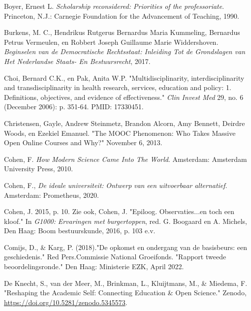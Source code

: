 \documentclass[smallauthor, chapterhaspagenum, nochapterinheader, pagenuminheader,  bigchapnum,medium2, tocpages,  garamond, titleinheader]{jote-book}
\begin{document}
\begin{references}
		Boyer, Ernest L. \emph{Scholarship reconsidered: Priorities of the professoriate}. Princeton, N.J.: Carnegie Foundation for the Advancement of Teaching, 1990.



		Burkens, M. C., Hendrikus Rutgerus Bernardus Maria Kummeling, Bernardus Petrus Vermeulen, en Robbert Joseph Guillaume Marie Widdershoven. \emph{Beginselen van de Democratische Rechtsstaat: Inleiding Tot de Grondslagen van Het Nederlandse Staats- En Bestuursrecht}, 2017.



		Choi, Bernard C.K., en Pak, Anita W.P. "Multidisciplinarity, interdisciplinarity and transdisciplinarity in health research, services, education and policy: 1. Definitions, objectives, and evidence of effectiveness." \emph{Clin Invest Med} 29, no. 6 (December 2006): p. 351-64. PMID: 17330451.



		Christensen, Gayle, Andrew Steinmetz, Brandon Alcorn, Amy Bennett, Deirdre Woods, en Ezekiel Emanuel. "The MOOC Phenomenon: Who Takes Massive Open Online Courses and Why?" November 6, 2013.



		Cohen, F.\emph{ How Modern Science Came Into The World}. Amsterdam: Amsterdam University Press, 2010.



		Cohen, F., \emph{De }\emph{ideale}\emph{ }\emph{universiteit}\emph{: }\emph{Ontwerp}\emph{ van }\emph{een}\emph{ }\emph{uitvoerbaar}\emph{ }\emph{alternatief}. Amsterdam: Prometheus, 2020.



		Cohen, J. 2015, p. 10. Zie ook, Cohen, J. "Epiloog. Observaties...en toch een kloof." In \emph{G1000: }\emph{Ervaringen}\emph{ met }\emph{burgertoppen}, red. G. Boogaard en A. Michels, Den Haag: Boom bestuurskunde, 2016, p. 103 e.v.



		Comijs, D., \& Karg, P. (2018)."De opkomst en ondergang van de basisbeurs: een geschiedenis." Red Pers.Commissie National Groeifonds. "Rapport tweede beoordelingsronde." Den Haag: Ministerie EZK, April 2022.



		De Knecht, S., van der Meer, M., Brinkman, L., Kluijtmans, M., \& Miedema, F. "Reshaping the Academic Self: Connecting Education \& Open Science." Zenodo, \href{https://doi.org/10.5281/zenodo.5345573}{https://doi.org/10.5281/zenodo.5345573}.




\end{references}
\end{document}
